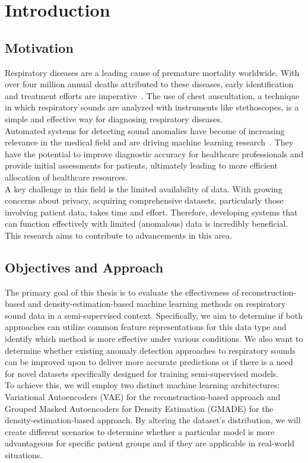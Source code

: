 \cleardoubleoddpage%
\chapter{Introduction}

\section{Motivation}
Respiratory diseases are a leading cause of premature mortality worldwide. With over four million annual deaths attributed to these diseases, early identification and treatment efforts are imperative~\cite{ferkol2014global}. The use of chest auscultation, a technique in which respiratory sounds are analyzed with instruments like stethoscopes, is a simple and effective way for diagnosing respiratory diseases.\\
Automated systems for detecting sound anomalies have become of increasing relevance in the medical field and are driving machine learning research~\cite{bohadana2014fundamentals}. They have the potential to improve diagnostic accuracy for healthcare professionals and provide initial assessments for patients, ultimately leading to more efficient allocation of healthcare resources.\\
A key challenge in this field is the limited availability of data. With growing concerns about privacy, acquiring comprehensive datasets, particularly those involving patient data, takes time and effort. Therefore, developing systems that can function effectively with limited (anomalous) data is incredibly beneficial. This research aims to contribute to advancements in this area.


\section{Objectives and Approach}

The primary goal of this thesis is to evaluate the effectiveness of reconstruction-based and density-estimation-based machine learning methods on respiratory sound data in a semi-supervised context. Specifically, we aim to determine if both approaches can utilize common feature representations for this data type and identify which method is more effective under various conditions. We also want to determine whether existing anomaly detection approaches to respiratory sounds can be improved upon to deliver more accurate predictions or if there is a need for novel datasets specifically designed for training semi-supervised models. \\
To achieve this, we will employ two distinct machine learning architectures: Variational Autoencoders (VAE) for the reconstruction-based approach and Grouped Masked Autoencoders for Density Estimation (GMADE) for the density-estimation-based approach. By altering the dataset's distribution, we will create different scenarios to determine whether a particular model is more advantageous for specific patient groups and if they are applicable in real-world situations.

